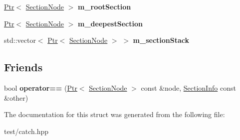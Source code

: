 \begin{DoxyCompactItemize}
\item 
\hyperlink{classCatch_1_1Ptr}{Ptr}$<$ \hyperlink{structCatch_1_1CumulativeReporterBase_1_1SectionNode}{Section\+Node} $>$ {\bfseries m\+\_\+root\+Section}\hypertarget{structCatch_1_1CumulativeReporterBase_a407c1ad0723f3e10efbb982c5adbd07c}{}\label{structCatch_1_1CumulativeReporterBase_a407c1ad0723f3e10efbb982c5adbd07c}

\item 
\hyperlink{classCatch_1_1Ptr}{Ptr}$<$ \hyperlink{structCatch_1_1CumulativeReporterBase_1_1SectionNode}{Section\+Node} $>$ {\bfseries m\+\_\+deepest\+Section}\hypertarget{structCatch_1_1CumulativeReporterBase_a9058ef2fc03d698503fccd918c64d0f2}{}\label{structCatch_1_1CumulativeReporterBase_a9058ef2fc03d698503fccd918c64d0f2}

\item 
std\+::vector$<$ \hyperlink{classCatch_1_1Ptr}{Ptr}$<$ \hyperlink{structCatch_1_1CumulativeReporterBase_1_1SectionNode}{Section\+Node} $>$ $>$ {\bfseries m\+\_\+section\+Stack}\hypertarget{structCatch_1_1CumulativeReporterBase_ae64972fbf6026c4f72ebbc9c0b1c9d41}{}\label{structCatch_1_1CumulativeReporterBase_ae64972fbf6026c4f72ebbc9c0b1c9d41}

\end{DoxyCompactItemize}
\subsection*{Friends}
\begin{DoxyCompactItemize}
\item 
bool {\bfseries operator==} (\hyperlink{classCatch_1_1Ptr}{Ptr}$<$ \hyperlink{structCatch_1_1CumulativeReporterBase_1_1SectionNode}{Section\+Node} $>$ const \&node, \hyperlink{structCatch_1_1SectionInfo}{Section\+Info} const \&other)\hypertarget{structCatch_1_1CumulativeReporterBase_a8a9f836c62348333bde04b059851b738}{}\label{structCatch_1_1CumulativeReporterBase_a8a9f836c62348333bde04b059851b738}

\end{DoxyCompactItemize}


The documentation for this struct was generated from the following file\+:\begin{DoxyCompactItemize}
\item 
test/catch.\+hpp\end{DoxyCompactItemize}
